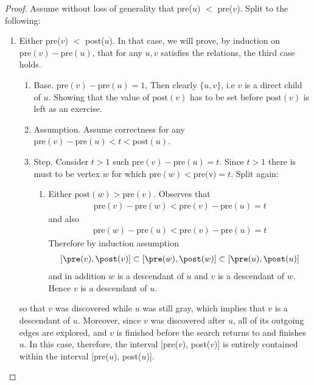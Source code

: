   \begin{proof} 
      Assume without loss of generality that pre($u$) $<$ pre($v$). Split to the following:
	\begin{enumerate}
	  \item Either pre($v$) $<$ post($u$). In that case, we will prove, by induction on $\text{pre}(v)-\text{pre}(u)$, that for any $u,v$ satisfies the relations, the third case holds. 
	    \begin{enumerate}
	      \item Base. $\text{pre}(v)-\text{pre}(u) = 1$, Then clearly $\{u,v\}$, i.e $v$ is a direct child of $u$. Showing that the value of $\text{post}(v)$ has to be set before  $\text{post}(v)$ is left as an exercise. 
	      \item Assumption. Assume correctness for any $\text{pre}(v)-\text{pre}(u) < t < \text{post}(u)$.
	      \item Step. Consider $t > 1$ such  $\text{pre}(v)-\text{pre}(u) = t$. Since $t > 1$ there is must to be vertex $w$ for which $\text{pre}(w) < \text{pre(v)} = t$. Split again:  
		\begin{enumerate}
		  \item Either $\text{post}(w) > \text{pre}(v)$. Observes that \begin{equation*}
		      \begin{split}
\text{pre}(v) - \text{pre}(w) < \text{pre}(v) - \text{pre}(u) = t
		      \end{split}
		    \end{equation*}
		     and also \begin{equation*}
		       \begin{split}
\text{pre}(w) - \text{pre}(u) < \text{pre}(v) - \text{pre}(u) = t
		       \end{split}
		     \end{equation*}
		      Therefore by induction assumption \begin{equation*}
			\begin{split}
[\pre(v),\post(v)] \subset [\pre(w),\post(w)]\subset [\pre(u),\post(u)]
			\end{split}
		      \end{equation*}
		      and in addition $w$ is a descendant of $u$ and $v$ is a descendant of $w$. Hence $v$ is a descendant of $u$.  
		\end{enumerate}
	    \end{enumerate}
	    so that $v$ was discovered while $u$ was still gray, which implies that $v$ is a descendant of $u$. Moreover, since $v$ was discovered after $u$, all of its outgoing edges are explored, and $v$ is finished before the search returns to and finishes $u$. In this case, therefore, the interval [pre($v$), post($v$)] is entirely contained within the interval [pre($u$), post($u$)].

\end{enumerate}
\end{proof}
